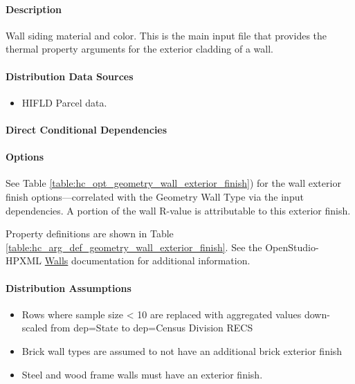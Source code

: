 \paragraph{Description}
% 
Wall siding material and color. This is the main input file that provides the thermal property arguments for the exterior cladding of a wall.

\paragraph{Distribution Data Sources}
% 
\begin{itemize}

\item
  HIFLD Parcel data.
\end{itemize}

\paragraph{Direct Conditional Dependencies}


\paragraph{Options}
See Table \ref{table:hc_opt_geometry_wall_exterior_finish}) for the wall exterior finish options---correlated with the Geometry Wall Type via the input dependencies. A portion of the wall R-value is attributable to this exterior finish.



Property definitions are shown in Table \ref{table:hc_arg_def_geometry_wall_exterior_finish}. See the OpenStudio-HPXML \href{https://openstudio-hpxml.readthedocs.io/en/v1.10.0/workflow_inputs.html#hpxml-walls}{Walls} documentation for additional information.



\paragraph{Distribution Assumptions}
% 
\begin{itemize}
\item
  Rows where sample size \textless{} 10 are replaced with aggregated
  values down-scaled from dep=\textquotesingle State\textquotesingle{}
  to dep=\textquotesingle Census Division RECS\textquotesingle{}
\item
  Brick wall types are assumed to not have an additional brick exterior
  finish
\item
  Steel and wood frame walls must have an exterior finish.
\end{itemize}
